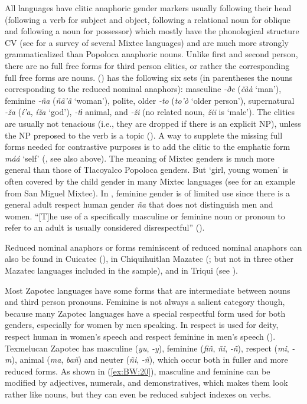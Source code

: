 \documentclass[output=collectionpaper]{langsci/langscibook}
\begin{document}
All  languages have clitic anaphoric gender markers usually following their head (following a verb for subject and object, following a relational noun for oblique and following a noun for possessor) which mostly have the phonological structure CV (see \citealt{Macri1983} for a survey of several Mixtec languages) and are much more strongly grammaticalized than Popoloca anaphoric nouns. Unlike first and second person, there are no full free forms for third person clitics, or rather the corresponding full free forms are nouns.  (\citealt[139]{Macaulay1996}) has the following six sets (in parentheses the nouns corresponding to the reduced nominal anaphors): masculine \textit{-ðe} (\textit{čàà} ‘man’), feminine \textit{-ña} (\textit{ñã’ã} ‘woman’), polite, older \textit{-to} (\textit{to’ò} ‘older person’), supernatural \textit{-ža} (\textit{í’a}, \textit{íža} ‘god’), \textit{-tɨ} animal, and \textit{-ži} (no related noun, \textit{žii} is ‘male’). The clitics are usually not tenacious (i.e., they are dropped if there is an explicit NP), unless the NP preposed to the verb is a topic (\citealt[140]{Macaulay1996}). A way to supplete the missing full forms needed for contrastive purposes is to add the clitic to the emphatic form \textit{máá} ‘self’ (\citealt[106]{Macaulay1996}, see also  above). The meaning of Mixtec genders is much more general than those of Tlacoyalco Popoloca genders. But ‘girl, young women’ is often covered by the child gender in many Mixtec languages (see  for an example from San Miguel Mixtec). In , feminine gender is of limited use since there is a general adult respect human gender \textit{ña} that does not distinguish men and women. “[T]he use of a specifically masculine or feminine noun or pronoun to refer to an adult is usually considered disrespectful” (\citealt[406]{Small1990}).

Reduced nominal anaphors or forms reminiscent of reduced nominal anaphors can also be found in Cuicatec (\citealt{Bradley1991}), in Chiquihuitlan Mazatec (\citealt{Capen1996}; but not in three other Mazatec languages included in the sample), and in Triqui (see ).

Most Zapotec languages have some forms that are intermediate between nouns and third person pronouns. Feminine is not always a salient category though, because many Zapotec languages have a special respectful form used for both genders, especially for women by men speaking. In  respect is used for deity, respect human in women’s speech and respect feminine in men’s speech (\citealt[290]{Speck1972}). Texmelucan Zapotec has masculine (\textit{yu}, \textit{-y}), feminine (\textit{fiñ}, \textit{ñi}, \textit{-ñ}), respect (\textit{mi}, \textit{-m}), animal (\textit{ma}, \textit{bañ}) and neuter (\textit{ñi}, \textit{-ñ}), which occur both in fuller and more reduced forms. As shown in (\ref{ex:BW:20}), masculine and feminine can be modified by adjectives, numerals, and demonstratives, which makes them look rather like nouns, but they can even be reduced subject indexes on verbs.
\end{document}
